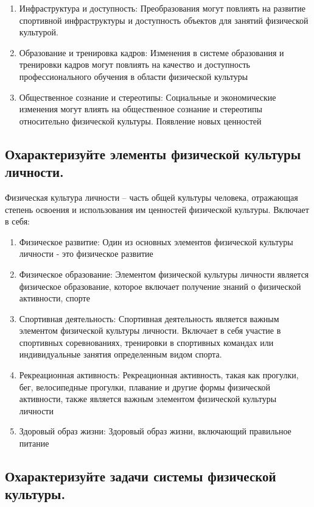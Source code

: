 \begin{enumerate}
    \item Инфраструктура и доступность: Преобразования могут повлиять на развитие спортивной инфраструктуры и доступность объектов для занятий физической культурой.
    \item Образование и тренировка кадров: Изменения в системе образования и тренировки кадров могут повлиять на качество и доступность профессионального обучения в области физической культуры
    \item Общественное сознание и стереотипы: Социальные и экономические изменения могут влиять на общественное сознание и стереотипы относительно физической культуры. Появление новых ценностей
\end{enumerate}

\subsection{Охарактеризуйте элементы физической культуры личности.}

Физическая культура личности – часть общей культуры человека, отражающая степень освоения и использования им ценностей физической культуры. Включает в себя:

\begin{enumerate}
    \item Физическое развитие: Один из основных элементов физической культуры личности - это физическое развитие
    \item Физическое образование: Элементом физической культуры личности является физическое образование, которое включает получение знаний о физической активности, спорте
    \item Спортивная деятельность: Спортивная деятельность является важным элементом физической культуры личности. Включает в себя участие в спортивных соревнованиях, тренировки в спортивных командах или индивидуальные занятия определенным видом спорта.
    \item Рекреационная активность: Рекреационная активность, такая как прогулки, бег, велосипедные прогулки, плавание и другие формы физической активности, также является важным элементом физической культуры личности
    \item Здоровый образ жизни: Здоровый образ жизни, включающий правильное питание
\end{enumerate}

\subsection{Охарактеризуйте задачи системы физической культуры.}

